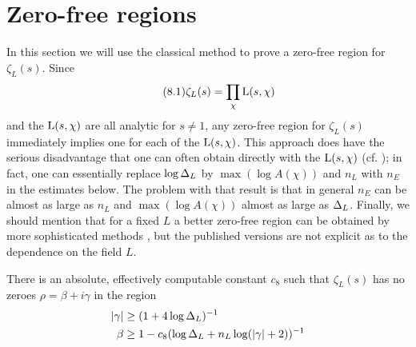 \documentclass[./main]{subfiles}
\begin{document}
\section{Zero-free regions}
In this section we will use the classical method to prove a zero-free region for $\zeta_L(s)$. Since 
\[\tag{8.1}\label{(8.1)} \zeta_L(s) = \prod_{\chi} \operatorname{L}(s, \chi)
\]
and the $\operatorname{L}(s, \chi)$ are all analytic for $s \neq 1$, any zero-free region for $\zeta_L(s)$ immediately implies one for each of the $\operatorname{L}(s, \chi)$. This approach does have the serious disadvantage that one can often obtain directly with the $\operatorname{L}(s, \chi)$ (cf. \cite[Ch. 14]{2-davenport2013multiplicative}); in fact, one can essentially replace $\log \Delta_L$ by $\max(\log A(\chi))$ and $n_L$ with $n_E$ in the estimates below. The problem with that result is that in general $n_E$ can be almost as large as $n_L$ and $\max(\log A(\chi))$ almost as large as $\Delta_L$. Finally, we should mention that for a fixed $L$ a better zero-free region can be obtained by more sophisticated methods \cite{12-Sokolovskii}, but the published versions are not explicit as to the dependence on the field $L$.
\begin{lemma}\label{8.1}
There is an absolute, effectively computable constant $c_8$ such that $\zeta_L(s)$ has no zeroes $\rho = \beta + i \gamma$ in the region 
\begin{align*}
|\gamma| &\geq (1 + 4\log \Delta_L)^{-1} \\
\beta &\geq 1 - c_8(\log \Delta_L + n_L \log(|\gamma| + 2))^{-1}
\end{align*}
\end{lemma}
\end{document}
